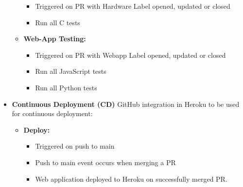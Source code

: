 \documentclass{article}
\begin{document}
\begin{itemize}
\begin{itemize}
\begin{itemize}
        \item Triggered on PR with Hardware Label opened, updated or closed
        \item Run all C tests
    \end{itemize}
    \item \textbf{Web-App Testing:} 
    \begin{itemize}
        \item Triggered on PR with Webapp Label opened, updated or closed
        \item Run all JavaScript tests
        \item Run all Python tests
    \end{itemize}

\end{itemize}
\item \textbf{Continuous Deployment (CD)} GitHub integration in Heroku to be used for continuous deployment:
\begin{itemize}
    \item \textbf{Deploy:}
    \begin{itemize}
        \item Triggered on push to main
        \item Push to main event occurs when merging a PR
        \item Web application deployed to Heroku on successfully merged PR.
    \end{itemize}
\end{itemize}


\end{itemize}
\end{document}
